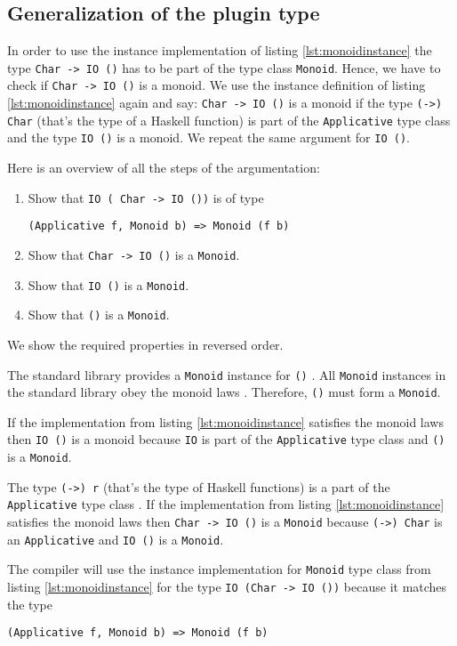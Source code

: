 \subsection{Generalization of the plugin type }
\label{sec:generalization}

In order to use the instance implementation of listing \ref{lst:monoidinstance} the type \verb|Char -> IO ()| has to be part of the type class \verb|Monoid|. 
Hence, we have to check if \verb|Char -> IO ()| is a monoid. We use the instance definition of listing \ref{lst:monoidinstance} again and say: \verb|Char -> IO ()| is a monoid if the type \verb|(->) Char| (that's the type of a Haskell function) is part of the \verb|Applicative| type class and the type \verb|IO ()| is a monoid. We repeat the same argument for \verb|IO ()|.

Here is an overview of all the steps of the argumentation:
\begin{enumerate}
\item Show that  \verb|IO ( Char -> IO ())| is of type 
\begin{verbatim}
(Applicative f, Monoid b) => Monoid (f b)
\end{verbatim}
\item Show that \verb|Char -> IO ()| is a \verb|Monoid|.
\item Show that \verb|IO ()| is a \verb|Monoid|.
\item Show that \verb|()| is a \verb|Monoid|.
\end{enumerate}

We show the required properties in reversed order.

\begin{etaremune}
\item The standard library provides a \verb|Monoid| instance for \verb|()| \cite{monoid}. All \verb|Monoid| instances in the standard library obey the monoid laws \cite{Lipovaca}. Therefore, \verb|()| must form a \verb|Monoid|.

\item If the implementation from listing \ref{lst:monoidinstance} satisfies the monoid laws then \verb|IO ()| is a monoid because \verb|IO| is part of the \verb|Applicative| type class \cite{control.applicative} and \verb|()| is a \verb|Monoid|.

\item The type \verb|(->) r| (that's the type of Haskell functions) is a part of the \verb|Applicative| type class \cite{control.applicative}.
If the implementation from listing \ref{lst:monoidinstance} satisfies the monoid laws then \verb|Char -> IO ()| is a \verb|Monoid| because \verb|(->) Char| is an \verb|Applicative| and \verb|IO ()| is a \verb|Monoid|.

\item The compiler will use the instance implementation for \verb|Monoid| type class from listing \ref{lst:monoidinstance} for the type \verb|IO (Char -> IO ())| because it matches the type
\begin{verbatim}
(Applicative f, Monoid b) => Monoid (f b)
\end{verbatim}

\end{etaremune} 

